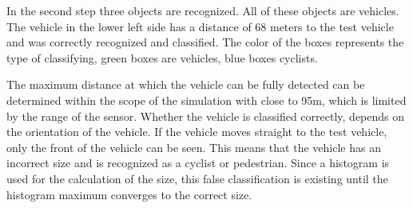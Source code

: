\documentclass[11pt,oneside,openright]{mpreport}
\begin{document}

In the second step three objects are recognized. All of these objects are vehicles. The vehicle in the lower left side has a distance of 68 meters to the test vehicle and 
was correctly recognized and classified. The color of the boxes represents the type of classifying, green boxes are vehicles, blue boxes cyclists.


The maximum distance at which the vehicle can be fully detected can be determined within the scope of the simulation with close to 95m,
which is limited by the range of the sensor. Whether the vehicle is classified correctly, depends on the orientation of the vehicle.
If the vehicle moves straight to the test vehicle, only the front of the vehicle can be seen. This means that the vehicle has an incorrect size and is recognized as a cyclist or pedestrian.
Since a histogram is used for the calculation of the size, this false classification is existing until the histogram maximum converges to the correct size.

\end{document}
